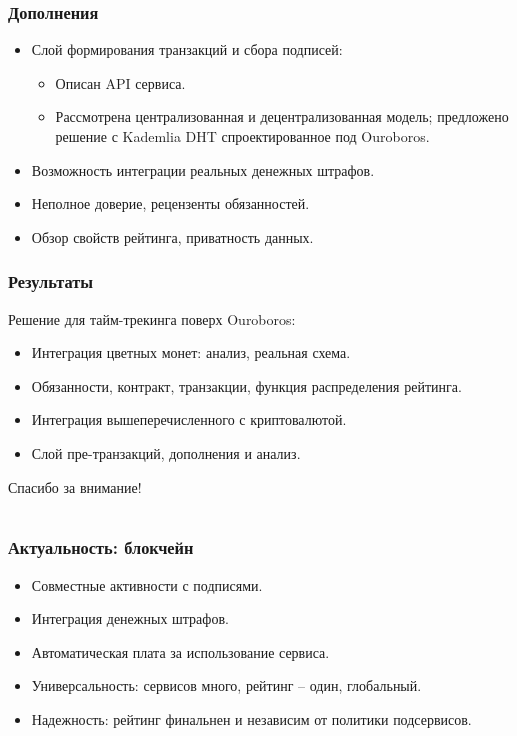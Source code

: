 \documentclass[11pt,handout,pdf,hyperref={unicode}]{beamer}
\newcommand{\backupbegin}{
   \newcounter{finalframe}
   \setcounter{finalframe}{\value{framenumber}}
}
\begin{document}
\begin{frame}
  \frametitle{Дополнения}

  \begin{itemize}
  \item Слой формирования транзакций и сбора подписей:
      \begin{itemize}
      \item Описан API сервиса.
      \item Рассмотрена централизованная и децентрализованная модель;
        предложено решение с Kademlia DHT спроектированное под
        Ouroboros.
      \end{itemize}
  \item Возможность интеграции реальных денежных штрафов.
  \item Неполное доверие, рецензенты обязанностей.
  \item Обзор свойств рейтинга, приватность данных.
  \end{itemize}
\end{frame}

\begin{frame}
  \frametitle{Результаты}

  Решение для тайм-трекинга поверх Ouroboros:
  \begin{itemize}
  \item Интеграция цветных монет: анализ, реальная схема.
  \item Обязанности, контракт, транзакции, функция распределения
    рейтинга.
  \item Интеграция вышеперечисленного с криптовалютой.
  \item Слой пре-транзакций, дополнения и анализ.
  \end{itemize}
   \begin{center}
    \Huge Спасибо за внимание!
  \end{center}
\end{frame}

\backupbegin
\section{}

\begin{frame}
  \frametitle{Актуальность: блокчейн}

  \begin{itemize}
  \item Совместные активности с подписями.
  \item Интеграция денежных штрафов.
  \item Автоматическая плата за использование сервиса.
  \item Универсальность: сервисов много, рейтинг -- один, глобальный.
  \item Надежность: рейтинг финальнен и независим от политики
    подсервисов.
  \end{itemize}
\end{frame}
\end{document}
